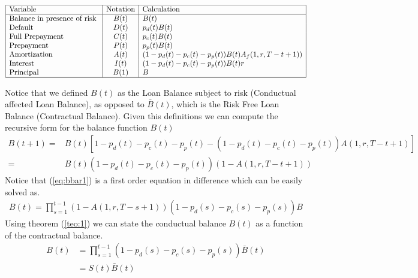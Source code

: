 \begin{center} %
\[ %
\begin{array}{|l|c|l|} \hline %
\mbox{Variable} &\mbox{Notation} & \mbox{Calculation}\\ \hline
\mbox{Balance in presence of risk }  & B(t)  & B(t)\\
\mbox{Default  }  & D(t) & p_d(t) B(t)\\
\mbox{Full Prepayment}  & C(t) & p_c(t) B(t)\\
\mbox{Prepayment  }  & P(t) & p_p(t)B(t)\\
\mbox{Amortization}  & A(t) &(1-p_d(t)-p_c(t)-p_p(t)) B(t)A_f(1,r,T-t+1))\\
\mbox{Interest }  & I(t) & (1-p_d(t)-p_c(t)-p_p(t))B(t)r\\
\mbox{Principal   }  &  B(1) & B\\
\hline
\end{array} %
\] %
\end{center}

Notice that we defined $B(t)$ as the Loan Balance subject to risk (Conductual affected Loan Balance), as opposed to $\bar{B}(t)$, which is the Risk Free Loan Balance (Contractual Balance).  Given this definitions we can compute the recursive form for the balance function $B(t)$
\begin{align}
B(t+1) =& B(t)[1-p_d(t)-p_c(t)-p_p(t)-(1-p_d(t)-p_c(t)-p_p(t))A(1,r,T-t+1) ] \nonumber\\
     =&
    B(t)(1-p_d(t)-p_c(t)-p_p(t))(1-A(1,r,T-t+1)) \label{eq:bbar1}\
\end{align}
Notice that (\ref{eq:bbar1}) is a first order equation in difference which can be easily solved as.
\begin{align}
    B(t) =\prod^{t-1}_{s=1} (1-A(1,r,T-s+1))(1-p_d(s)-p_c(s)-p_p(s))B
\end{align}
Using theorem (\ref{teo:1}) we can state the conductual balance $B(t)$ as a function of the contractual balance.
\begin{align}
    B(t) &=\prod^{t-1}_{s=1} (1-p_d(s)-p_c(s)-p_p(s))\bar{B}(t) \nonumber\\
    &=S(t)\bar{B}(t)
\end{align}

